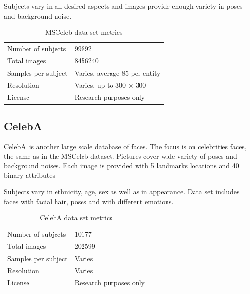 Subjects vary in all desired aspects and images provide enough variety in poses and background noise.

\begin{table}[ht]
    \centering
    \caption{MSCeleb data set metrics}

    \begin{tabularx}{.8\textwidth}{l|X}
        \toprule
        Number of subjects & \num{99892} \\
        Total images & \num{8456240} \\
        Samples per subject & Varies, average 85 per entity \\
        Resolution & Varies, up to 300 $\times$ 300 \\
        License & Research purposes only \\
        \bottomrule
    \end{tabularx}
\end{table}

\subsection{CelebA}

CelebA\,\cite{celeba} is another large scale database of faces. The focus is on celebrities faces, the same as in the MSCeleb dataset. Pictures cover wide variety of poses and background noises. Each image is provided with 5 landmarks locations and 40 binary attributes.

Subjects vary in ethnicity, age, sex as well as in appearance. Data set includes faces with facial hair, poses and with different emotions.

\begin{table}[ht]
    \centering
    \caption{CelebA data set metrics}

    \begin{tabularx}{.8\textwidth}{l|X}
        \toprule
        Number of subjects & \num{10177} \\
        Total images & \num{202599} \\
        Samples per subject & Varies \\
        Resolution & Varies \\
        License & Research purposes only \\
        \bottomrule
    \end{tabularx}
\end{table}
